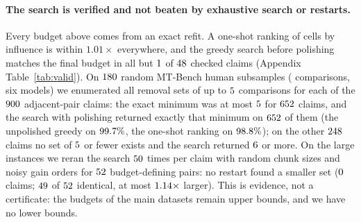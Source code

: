 \documentclass{article}
\begin{document}
\paragraph{The search is verified and not beaten by exhaustive search or restarts.} Every budget above comes from an exact refit. A one-shot ranking of cells by influence is within $1.01\times$ everywhere, and the greedy search before polishing matches the final budget in all but $1$ of $48$ checked claims (Appendix Table~\ref{tab:valid}). On $180$ random MT-Bench human subsamples (\exMs{} comparisons, six models) we enumerated all removal sets of up to $5$ comparisons for each of the $900$ adjacent-pair claims: the exact minimum was at most $5$ for $652$ claims, and the search with polishing returned exactly that minimum on $652$ of them (the unpolished greedy on $99.7\%$, the one-shot ranking on $98.8\%$); on the other $248$ claims no set of $5$ or fewer exists and the search returned $6$ or more. On the large instances we reran the search $50$ times per claim with random chunk sizes and noisy gain orders for $52$ budget-defining pairs: no restart found a smaller set ($0$ claims; $49$ of $52$ identical, at most $1.14\times$ larger). This is evidence, not a certificate: the budgets of the main datasets remain upper bounds, and we have no lower bounds.
\end{document}
